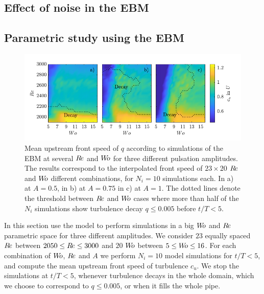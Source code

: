 \documentclass{article}
\DeclareRobustCommand{\Reynolds}{\ensuremath{R\hspace{-0.1em}e}\xspace}     %
\DeclareRobustCommand{\Womersley}{\ensuremath{W\hspace{-0.25em}o}\xspace}    %
\DeclareRobustCommand{\Amplitude}{\ensuremath{A}\xspace}    %
\begin{document}
\subsection{Effect of noise in the EBM}





\subsection{Parametric study using the EBM}
\begin{figure}
\centering
\includegraphics[width=\textwidth, trim=0mm 0mm 0mm 0mm, clip=true]{Figures9/Fig5.pdf}
\caption{Mean upstream front speed of $q$ according to simulations of the EBM at several \Reynolds and \Womersley for three different pulsation amplitudes. The results correspond to the interpolated front speed of $23\times20$ \Reynolds and \Womersley different combinations, for $N_{i}=10$ simulations each. In a) at $\Amplitude=0.5$, in b) at $\Amplitude=0.75$ in c) at $\Amplitude=1$. The dotted lines denote the threshold between \Reynolds and \Womersley cases where more than half of the $N_{i}$ simulations show turbulence decay $q\leq0.005$ before $t/T<5$.}
\label{fig:fig5}
\end{figure}

In this section use the model to perform simulations in a big \Womersley and \Reynolds parametric space for three different amplitudes. We consider $23$ equally spaced \Reynolds between $2050\leq \Reynolds \leq 3000$ and $20$ \Womersley between $5\leq \Womersley \leq 16$. For each combination of \Womersley, \Reynolds and \Amplitude we perform $N_{i}=10$ model simulations for $t/T<5$, and compute the mean upstream front speed of turbulence $c_{u}$. We stop the simulations at $t/T<5$, whenever turbulence decays in the whole domain, which we choose to correspond to $q \leq 0.005$, or when it fills the whole pipe. 
\end{document}
